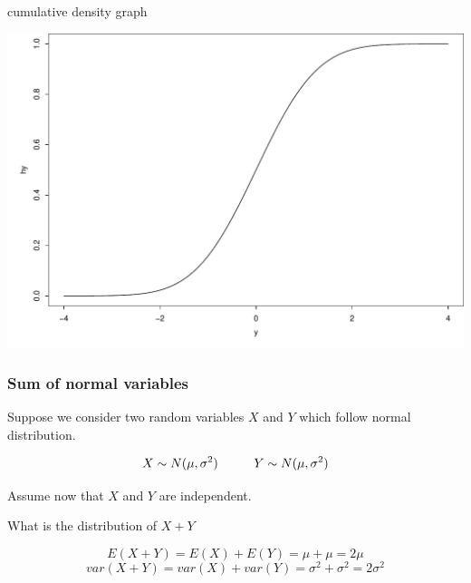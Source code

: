 \documentclass{beamer}\usepackage[]{graphicx}\usepackage[]{color}
\newenvironment{knitrout}{}{} %
\renewenvironment{knitrout}{\begin{spacing}{0.75}\begin{tiny}}{\end{tiny}\end{spacing}}
\begin{document}
\begin{frame}{cumulative density graph}

\begin{knitrout}\small
{}\color{fgcolor}

{\centering \includegraphics[width=0.99\linewidth]{figure/graphics-unnamed-chunk-8-1} 

}



\end{knitrout}

\end{frame}

\begin{frame}
\frametitle{Sum of normal variables}

Suppose we consider two random variables $X$ and $Y$ which follow normal distribution.

$$ X \sim N(\mu, \sigma^2)  \hspace{1 cm} Y \sim N(\mu, \sigma^2) $$ \pause \newline

Assume now that $X$ and $Y$ are independent. \pause \newline

What is the distribution of $X+Y$ \pause \newline 

$$ E(X+Y) = E(X) + E(Y) = \mu + \mu = 2 \mu $$
$$ var(X+Y) = var(X) + var(Y) = \sigma^2 + \sigma^2 = 2 \sigma^2 $$

\end{frame}
\end{document}
